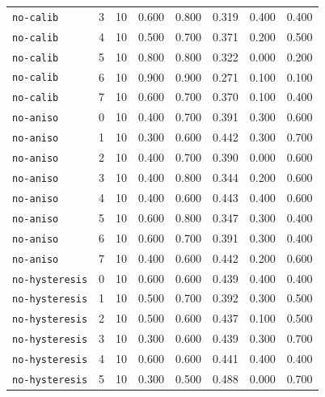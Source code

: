 \documentclass{article}
\begin{document}
\begin{center}
{\begin{tabular}{lllccccc}
\texttt{no-calib} & 3 & 10 & 0.600 & 0.800 & 0.319 & 0.400 & 0.400 \\
\texttt{no-calib} & 4 & 10 & 0.500 & 0.700 & 0.371 & 0.200 & 0.500 \\
\texttt{no-calib} & 5 & 10 & 0.800 & 0.800 & 0.322 & 0.000 & 0.200 \\
\texttt{no-calib} & 6 & 10 & 0.900 & 0.900 & 0.271 & 0.100 & 0.100 \\
\texttt{no-calib} & 7 & 10 & 0.600 & 0.700 & 0.370 & 0.100 & 0.400 \\
\texttt{no-aniso} & 0 & 10 & 0.400 & 0.700 & 0.391 & 0.300 & 0.600 \\
\texttt{no-aniso} & 1 & 10 & 0.300 & 0.600 & 0.442 & 0.300 & 0.700 \\
\texttt{no-aniso} & 2 & 10 & 0.400 & 0.700 & 0.390 & 0.000 & 0.600 \\
\texttt{no-aniso} & 3 & 10 & 0.400 & 0.800 & 0.344 & 0.200 & 0.600 \\
\texttt{no-aniso} & 4 & 10 & 0.400 & 0.600 & 0.443 & 0.400 & 0.600 \\
\texttt{no-aniso} & 5 & 10 & 0.600 & 0.800 & 0.347 & 0.300 & 0.400 \\
\texttt{no-aniso} & 6 & 10 & 0.600 & 0.700 & 0.391 & 0.300 & 0.400 \\
\texttt{no-aniso} & 7 & 10 & 0.400 & 0.600 & 0.442 & 0.200 & 0.600 \\
\texttt{no-hysteresis} & 0 & 10 & 0.600 & 0.600 & 0.439 & 0.400 & 0.400 \\
\texttt{no-hysteresis} & 1 & 10 & 0.500 & 0.700 & 0.392 & 0.300 & 0.500 \\
\texttt{no-hysteresis} & 2 & 10 & 0.500 & 0.600 & 0.437 & 0.100 & 0.500 \\
\texttt{no-hysteresis} & 3 & 10 & 0.300 & 0.600 & 0.439 & 0.300 & 0.700 \\
\texttt{no-hysteresis} & 4 & 10 & 0.600 & 0.600 & 0.441 & 0.400 & 0.400 \\
\texttt{no-hysteresis} & 5 & 10 & 0.300 & 0.500 & 0.488 & 0.000 & 0.700 \\
\bottomrule
\end{tabular}%
}
\end{center}
\end{document}
